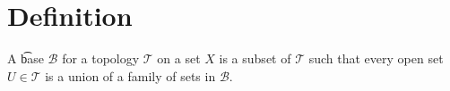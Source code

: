 
\section*{Definition}

A \t{base} $\mathcal{B} $ for a topology $\mathcal{T} $ on a set $X$ is a subset of $\mathcal{T} $ such that every open set $U \in \mathcal{T} $ is a union of a family of sets in $\mathcal{B} $.

\blankpage